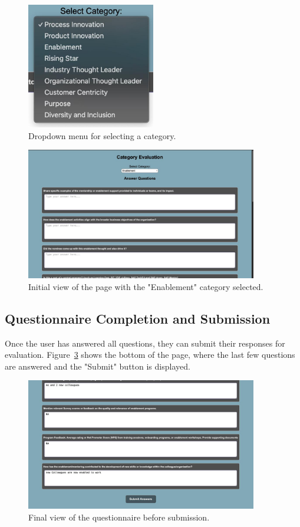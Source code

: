 \begin{figure}[H]
    \centering
    \includegraphics[width=0.5\textwidth]{img/categories.jpeg}
    \caption{Dropdown menu for selecting a category.}
    \label{fig:categories}
\end{figure}

\begin{figure}[H]
    \centering
    \includegraphics[width=0.9\textwidth]{img/empty.jpeg}
    \caption{Initial view of the page with the "Enablement" category selected.}
    \label{fig:empty}
\end{figure}

\subsection{Questionnaire Completion and Submission}
Once the user has answered all questions, they can submit their responses for evaluation. 
Figure~\ref{fig:submit} shows the bottom of the page, where the last few questions are answered and the "Submit" button is displayed.

\begin{figure}[H]
    \centering
    \includegraphics[width=0.9\textwidth]{img/submit.jpeg}
    \caption{Final view of the questionnaire before submission.}
    \label{fig:submit}
\end{figure}

